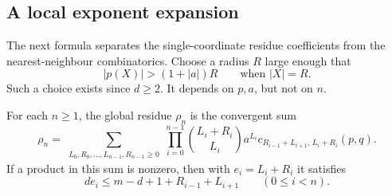 \subsection{A local exponent expansion}

The next formula separates the single-coordinate residue coefficients
from the nearest-neighbour combinatorics. Choose a radius $R$ large
enough that
\begin{equation}\label{eq:radius}
 |p(X)|>(1+|a|)R\qquad\text{when }|X|=R.
\end{equation}
Such a choice exists since $d\ge2$. It depends on $p,a$, but not on $n$.

\begin{lemma}\label{lem:local-expansion}
For each $n\ge1$, the global residue $\rho_n$ is the convergent sum
\begin{equation}\label{eq:configuration-sum}
 \rho_n=
 \sum_{\substack{L_0,R_0,\ldots,L_{n-1},R_{n-1}\ge0}}
 \prod_{i=0}^{n-1}
 \binom{L_i+R_i}{L_i}a^{L_i}
 c_{R_{i-1}+L_{i+1},\,L_i+R_i}(p,q).
\end{equation}
If a product in this sum is nonzero, then with $e_i=L_i+R_i$ it satisfies
\begin{equation}\label{eq:flow-inequality}
 d e_i\le m-d+1+R_{i-1}+L_{i+1}
 \qquad(0\le i<n).
\end{equation}
\end{lemma}

